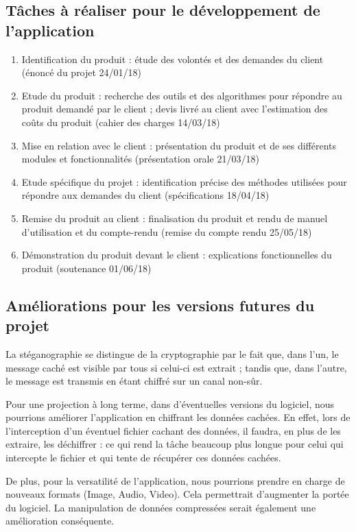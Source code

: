\documentclass[11pt]{article}
\begin{document}
\subsection{Tâches à réaliser pour le développement de l'application}
\begin {enumerate}
\item Identification du produit : étude des volontés et des demandes du client (énoncé du projet 24/01/18)
\item Etude du produit : recherche des outils et des algorithmes pour répondre au produit demandé par le client ; 
devis livré au client avec l'estimation des coûts du produit (cahier des charges 14/03/18)
\item Mise en relation avec le client : présentation du produit et de ses différents modules et fonctionnalités (présentation orale 21/03/18)
\item Etude spécifique du projet : identification précise des méthodes utilisées pour répondre aux demandes du client (spécifications 18/04/18)
\item Remise du produit au client : finalisation du produit et rendu de manuel d'utilisation et du compte-rendu (remise du compte rendu 25/05/18)
\item Démonstration du produit devant le client : explications fonctionnelles du produit (soutenance 01/06/18)
\end{enumerate}

\subsection{Améliorations pour les versions futures du projet}
La stéganographie se distingue de la cryptographie par le fait que, dans l'un, le message caché est visible par tous si celui-ci est extrait ; tandis que, dans l'autre, 
le message est transmis en étant chiffré sur un canal non-sûr. 

Pour une projection à long terme, dans d'éventuelles versions du logiciel, nous pourrions améliorer l'application en chiffrant les données cachées. 
En effet, lors de l'interception d'un éventuel fichier cachant des données, il faudra, en plus de les extraire, les déchiffrer : ce qui rend la tâche beaucoup plus longue
pour celui qui intercepte le fichier et qui tente de récupérer ces données cachées. 

De plus, pour la versatilité de l'application, nous pourrions prendre en charge de nouveaux formats (Image, Audio, Video). Cela permettrait d'augmenter la 
portée du logiciel. La manipulation de données compressées serait également une amélioration conséquente. 
\end{document}
